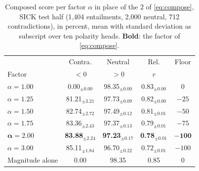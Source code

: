 \begin{table}[t]
\centering\small
\setlength{\tabcolsep}{2pt}
\begin{tabular}{l ccc c}
\toprule
 & Contra. & Neutral & Rel. & Floor \\
Factor & $<0$ & $>0$ & $r$ & \\
\midrule
$\alpha = 1.00$ & 0.00$_{\pm 0.00}$ & 98.35$_{\pm 0.00}$ & 0.83$_{\pm 0.00}$ & $0$ \\
$\alpha = 1.25$ & 81.21$_{\pm 3.21}$ & 97.73$_{\pm 0.09}$ & 0.82$_{\pm 0.00}$ & $-25$ \\
$\alpha = 1.50$ & 82.74$_{\pm 2.72}$ & 97.49$_{\pm 0.12}$ & 0.81$_{\pm 0.01}$ & $-50$ \\
$\alpha = 1.75$ & 83.36$_{\pm 2.43}$ & 97.37$_{\pm 0.13}$ & 0.79$_{\pm 0.01}$ & $-75$ \\
$\boldsymbol{\alpha = 2.00}$ & \textbf{83.88$_{\pm 2.24}$} & \textbf{97.23$_{\pm 0.17}$} & \textbf{0.78$_{\pm 0.01}$} & $\mathbf{-100}$ \\
$\alpha = 3.00$ & 85.11$_{\pm 1.84}$ & 96.70$_{\pm 0.22}$ & 0.72$_{\pm 0.01}$ & $-100$ \\
Magnitude alone & 0.00 & 98.35 & 0.85 & $0$ \\
\bottomrule
\end{tabular}
\caption{Composed score per factor $\alpha$ in place of the $2$ of \autoref{eq:compose}, SICK test half (1{,}404 entailments, 2{,}000 neutral, 712 contradictions), in percent, mean with standard deviation as subscript over ten polarity heads. \textbf{Bold}: the factor of \autoref{eq:compose}.}
\label{tab:composition}
\end{table}
